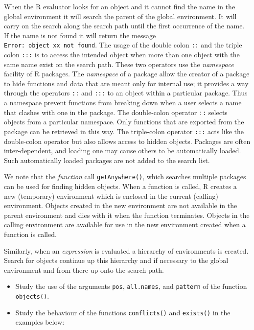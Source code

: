 \documentclass[
]{book}
\providecommand{\tightlist}{%
  \setlength{\itemsep}{0pt}\setlength{\parskip}{0pt}}
\begin{document}
When the R evaluator looks for an object and it cannot find the name in the global environment it will search the parent of the global environment. It will carry on the search along the search path until the first occurrence of the name. If the name is not found it will return the message \texttt{Error:\ object\ \textquotesingle{}xx\textquotesingle{}\ not\ found}. The usage of the double colon \texttt{::} and the triple colon \texttt{:::} is to access the intended object when more than one object with the same name exist on the search path. These two operators use the \emph{{namespace}} facility of R packages. The \emph{{namespace}} of a package allow the creator of a package to hide functions and data that are meant only for internal use; it provides a way through the operators \texttt{::} and \texttt{:::} to an object within a particular package. Thus a namespace prevent functions from breaking down when a user selects a name that clashes with one in the package. The double-colon operator \texttt{::} selects objects from a particular namespace. Only functions that are exported from the package can be retrieved in this way. The triple-colon operator \texttt{:::} acts like the double-colon operator but also allows access to hidden objects. Packages are often inter-dependent, and loading one may cause others to be automatically loaded. Such automatically loaded packages are not added to the search list.

We note that the \emph{{function}} call \texttt{getAnywhere()}, which searches multiple packages can be used for finding hidden objects. When a function is called, R creates a new (temporary) environment which is enclosed in the current (calling) environment. Objects created in the new environment are not available in the parent environment and dies with it when the function terminates. Objects in the calling environment are available for use in the new environment created when a function is called.

Similarly, when an \emph{{expression}} is evaluated a hierarchy of environments is created. Search for objects continue up this hierarchy and if necessary to the global environment and from there up onto the search path.

\begin{itemize}
\tightlist
\item
  Study the use of the arguments \texttt{pos}, \texttt{all.names}, and \texttt{pattern} of the function \texttt{objects()}.
\item
  Study the behaviour of the functions \texttt{conflicts()} and \texttt{exists()} in the examples below:
\end{itemize}
\end{document}
